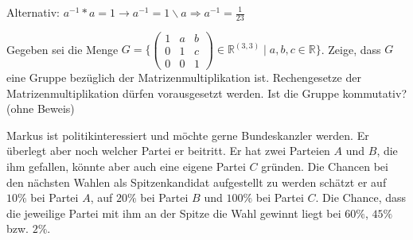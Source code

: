 \documentclass[10pt, a4paper]{exam}
\begin{document}
\begin{questions}
\begin{parts}
\begin{solution}
      Alternativ: $a^{-1}*a=1 \rightarrow a^{-1}=1\backslash a \Rightarrow a^{-1}=\frac{1}{23}$


    \end{solution}
  \end{parts}

  \question Gegeben sei die Menge $G=\{ \begin{pmatrix} 1&a&b\\0&1&c\\0&0&1 \end{pmatrix} \in\mathbb{R}^{(3,3)}\mid a,b,c\in\mathbb{R}\}$. Zeige, dass $G$ eine Gruppe bezüglich der Matrizenmultiplikation ist. Rechengesetze der Matrizenmultiplikation dürfen vorausgesetzt werden. Ist die Gruppe kommutativ? (ohne Beweis)
  \begin{solution}
  \end{solution}

  \question Markus ist politikinteressiert und möchte gerne Bundeskanzler werden. Er überlegt aber noch welcher Partei er beitritt. Er hat zwei Parteien $A$ und $B$, die ihm gefallen, könnte aber auch eine eigene Partei $C$ gründen. Die Chancen bei den nächsten Wahlen als Spitzenkandidat aufgestellt zu werden schätzt er auf $10\%$ bei Partei $A$, auf $20\%$ bei Partei $B$ und $100\%$ bei Partei $C$. Die Chance, dass die jeweilige Partei mit ihm an der Spitze die Wahl gewinnt liegt bei $60\%$, $45\%$ bzw. $2\%$.
\end{questions}
\end{document}
